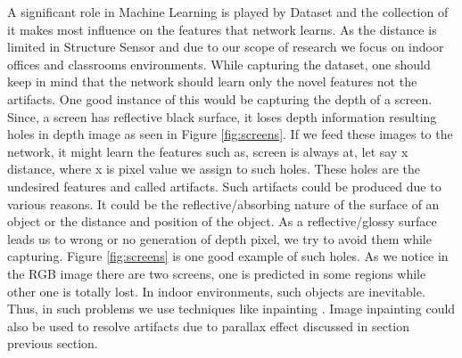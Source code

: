 A significant role in Machine Learning is played by Dataset and the collection of it makes most influence on the features that network learns. As the distance is limited in Structure Sensor and due to our scope of research we focus on indoor offices and classrooms environments. While capturing the dataset, one should keep in mind that the network should learn only the novel features not the artifacts. One good instance of this would be capturing the depth of a screen. Since, a screen has reflective black surface, it loses depth information resulting holes in depth image as seen in Figure \ref{fig:screens}. If we feed these images to the network, it might learn the features such as, screen is always at, let say x distance, where x is pixel value we assign to such holes. These holes are the undesired features and called artifacts. Such artifacts could be produced due to various reasons. It could be the reflective/absorbing nature of the surface of an object or the distance and position of the object\cite{geomar41830}. As a reflective/glossy surface leads us to wrong or no generation of depth pixel, we try to avoid them while capturing. Figure \ref{fig:screens} is one good example of such holes. As we notice in the RGB image there are two screens, one is predicted in some regions while other one is totally lost. In indoor environments, such objects are inevitable. Thus, in such problems we use techniques like inpainting \cite{inpainting}. Image inpainting could also be used to resolve artifacts due to parallax effect discussed in section previous section.\\
